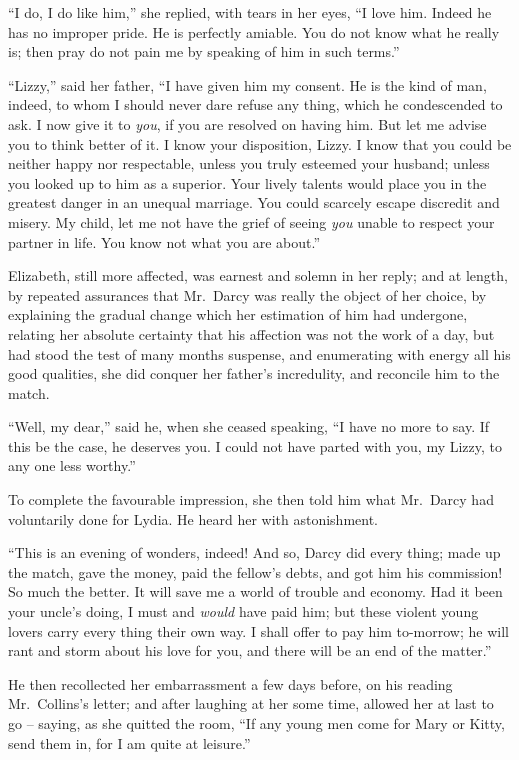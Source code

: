 “I do, I do like him,” she replied, with tears in her eyes,
“I love him. Indeed he has no improper pride. He is
perfectly amiable. You do not know what he really is;
then pray do not pain me by speaking of him in such
terms.”

“Lizzy,” said her father, “I have given him my consent.
He is the kind of man, indeed, to whom I should never
dare refuse any thing, which he condescended to ask.
I now give it to \textit{you}, if you are resolved on having him.
But let me advise you to think better of it. I know your
disposition, Lizzy. I know that you could be neither
happy nor respectable, unless you truly esteemed your
husband; unless you looked up to him as a superior.
Your lively talents would place you in the greatest danger
in an unequal marriage. You could scarcely escape discredit
and misery. My child, let me not have the grief
of seeing \textit{you} unable to respect your partner in life. You
know not what you are about.”

Elizabeth, still more affected, was earnest and solemn
in her reply; and at length, by repeated assurances that
Mr.\ Darcy was really the object of her choice, by explaining
the gradual change which her estimation of him had
undergone, relating her absolute certainty that his affection
was not the work of a day, but had stood the test
of many months suspense, and enumerating with energy
all his good qualities, she did conquer her father’s incredulity,
and reconcile him to the match.

“Well, my dear,” said he, when she ceased speaking,
“I have no more to say. If this be the case, he deserves
you. I could not have parted with you, my Lizzy, to
any one less worthy.”

To complete the favourable impression, she then told
him what Mr.\ Darcy had voluntarily done for Lydia.
He heard her with astonishment.

“This is an evening of wonders, indeed! And so,
Darcy did every thing; made up the match, gave the
money, paid the fellow’s debts, and got him his commission!
So much the better. It will save me a world
of trouble and economy. Had it been your uncle’s doing,
I must and \textit{would} have paid him; but these violent young
lovers carry every thing their own way. I shall offer to
pay him to-morrow; he will rant and storm about his
love for you, and there will be an end of the matter.”

He then recollected her embarrassment a few days
before, on his reading Mr.\ Collins’s letter; and after
laughing at her some time, allowed her at last to go -- saying,
as she quitted the room, “If any young men come
for Mary or Kitty, send them in, for I am quite at leisure.”

